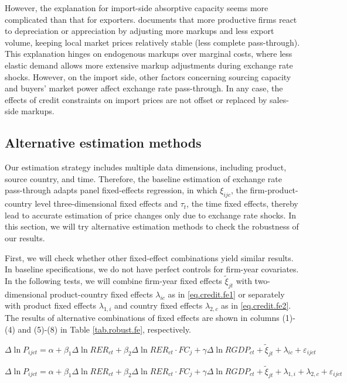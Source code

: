 However, the explanation for import-side absorptive capacity seems more complicated than that for exporters. \cite{bmm2012} documents that more productive firms react to depreciation or appreciation by adjusting more markups and less export volume, keeping local market prices relatively stable (less complete pass-through). This explanation hinges on endogenous markups over marginal costs, where less elastic demand allows more extensive markup adjustments during exchange rate shocks. However, on the import side, other factors concerning sourcing capacity and buyers' market power affect exchange rate pass-through. In any case, the effects of credit constraints on import prices are not offset or replaced by sales-side markups.

\subsection{Alternative estimation methods}

Our estimation strategy includes multiple data dimensions, including product, source country, and time. Therefore, the baseline estimation of exchange rate pass-through adapts panel fixed-effects regression, in which $\xi_{ijc}$, the firm-product-country level three-dimensional fixed effects and $\tau_t$, the time fixed effects, thereby lead to accurate estimation of price changes only due to exchange rate shocks. In this section, we will try alternative estimation methods to check the robustness of our results.

First, we will check whether other fixed-effect combinations yield similar results. In baseline specifications, we do not have perfect controls for firm-year covariates. In the following tests, we will combine firm-year fixed effects $\tilde{\xi}_{jt}$ with two-dimensional product-country fixed effects $\lambda_{ic}$ as in \ref{eq.credit.fe1} or separately with product fixed effects $\lambda_{1, i}$ and country fixed effects $\lambda_{2, c}$ as in \ref{eq.credit.fe2}. The results of alternative combinations of fixed effects are shown in columns (1)-(4) and (5)-(8) in Table \ref{tab.robust.fe}, respectively. 

\begin{equation}
    \Delta \ln P_{ijct}=\alpha+\beta_{1} \Delta \ln RER_{ct}+\beta_{2} \Delta \ln RER_{ct} \cdot FC_{j}+\gamma \Delta \ln RGDP_{ct}+\tilde{\xi}_{jt}+\lambda_{ic}+\varepsilon_{ijct}
	\label{eq.credit.fe1}
\end{equation}

\begin{equation}
    \Delta \ln P_{ijct}=\alpha+\beta_{1} \Delta \ln RER_{ct}+\beta_{2} \Delta \ln RER_{ct} \cdot FC_{j}+\gamma \Delta \ln RGDP_{ct}+\tilde{\xi}_{jt}+\lambda_{1, i} + \lambda_{2, c} +\varepsilon_{ijct}
	\label{eq.credit.fe2}
\end{equation}

